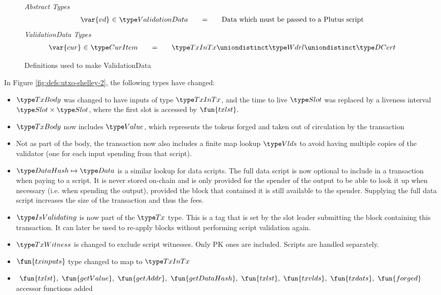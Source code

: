 \begin{figure*}[htb]
  \emph{Abstract Types}
  \begin{equation*}
    \begin{array}{r@{~\in~}l@{\qquad=\qquad}l}
      \var{vd}
      & \ValidationData
      & \text{Data which must be passed to a Plutus script}
    \end{array}
  \end{equation*}
  \emph{ValidationData Types}
  \begin{equation*}
    \begin{array}{r@{~\in~}l@{\qquad=\qquad}l}
      \var{cur}
      & \CurItem
      & \TxInTx \uniondistinct \Wdrl \uniondistinct \DCert
    \end{array}
  \end{equation*}
  \caption{Definitions used to make ValidationData}
  \label{fig:defs:utxo-pending}
\end{figure*}


In Figure \ref{fig:defs:utxo-shelley-2}, the following types have changed:

\begin{itemize}
  \item $\TxBody$ was changed to have inputs of type $\TxInTx$, and the
  time to live $\Slot$ was replaced by a liveness interval $\Slot \times \Slot$,
  where the first slot is accessed by $\fun{txlst}$.
  \item $\TxBody$ now includes $\Value$, which represents
  the tokens forged and taken out of circulation by the transaction
  \item Not as part of the body, the transaction now also includes
  a finite map lookup $\Vlds$ to avoid having multiple
  copies of the validator (one for each input spending from that script).
  \item $\HashDat \mapsto \Data$ is a similar lookup for data scripts.
  The full data script is now optional to include in a transaction when
  paying to a script. It is never
  stored on-chain and is only provided for the spender of the output
  to be able to look it up when necessary (i.e. when spending the output),
  provided the block that contained it is still available to the spender.
  Supplying the full data script increases the size of the transaction and
  thus the fees.
  \item $\IsValidating$ is now part of the $\Tx$ type. This is a tag that is
  set by the slot leader submitting the block containing this transaction.
  It can later be used to re-apply blocks without performing script validation
  again.
  \item $\TxWitness$ is changed to exclude script witnesses. Only PK ones
  are included. Scripts are handled separately.
  \item $\fun{txinputs}$ type changed to map to $\TxInTx$
  \item $~\fun{txlst},~\fun{getValue},~\fun{getAddr}, ~\fun{getDataHash},
  ~\fun{txlst},~\fun{txvlds},~\fun{txdats},
  ~\fun{forged}$
  accessor functions added
\end{itemize}



